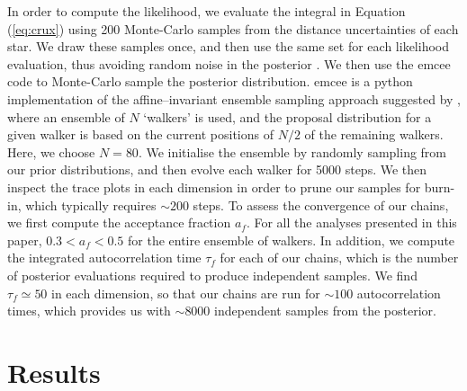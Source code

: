 \documentclass[useAMS,twocolumn,usenatbib]{mn2e}
\begin{document}
In order to compute the likelihood, we evaluate the integral in Equation (\ref{eq:crux}) using 200 Monte-Carlo samples from the distance uncertainties of each star. 
We draw these samples once, and then use the same set for each likelihood evaluation, thus avoiding random noise in the posterior \citep{Mc13}.
We then use the {\sc emcee} code \citep{emcee} to Monte-Carlo sample the posterior distribution. 
{\sc emcee} is a {\sc python} implementation of the affine--invariant ensemble sampling approach suggested by \citet{Go10}, where an ensemble of $N$ `walkers' is used, and the proposal distribution for a given walker is based on the current positions of $N/2$ of the remaining walkers. 
Here, we choose $N=80$.
We initialise the ensemble by randomly sampling from our prior distributions, and then evolve each walker for 5000 steps. 
We then inspect the trace plots in each dimension in order to prune our samples for burn-in, which typically requires $\sim 200$ steps. 
To assess the convergence of our chains, we first compute the acceptance fraction $a_f$.
For all the analyses presented in this paper, $0.3 < a_f < 0.5$ for the entire ensemble of walkers.
In addition, we compute the integrated autocorrelation time $\tau_f$ for each of our chains, which is the number of posterior evaluations required to produce independent samples.
We find $\tau_f \simeq 50$ in each dimension, so that our chains are run for $\sim 100$ autocorrelation times, which provides us with $\sim 8000$ independent samples from the posterior.

\section{Results}

\label{sec:res}
\end{document}
